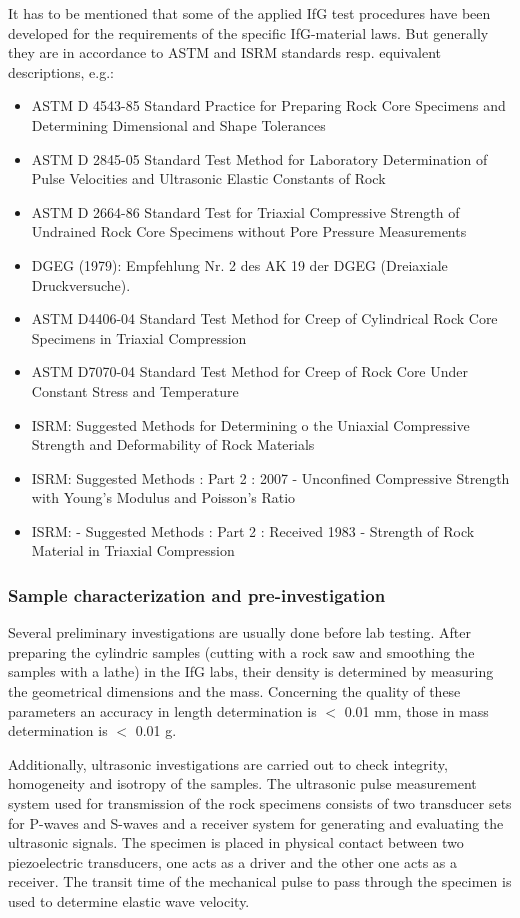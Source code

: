 It has to be mentioned that some of the applied IfG test procedures have been developed for the requirements of the specific IfG-material laws. 
But generally they are in accordance to ASTM and ISRM standards resp. equivalent descriptions, e.g.:

\begin{itemize}
\item ASTM D 4543-85 Standard Practice for Preparing Rock Core Specimens and Determining Dimensional and Shape Tolerances
\item ASTM D 2845-05 Standard Test Method for Laboratory Determination of Pulse Velocities and Ultrasonic Elastic Constants of Rock
\item ASTM D 2664-86 Standard Test for Triaxial Compressive Strength of Undrained Rock Core Specimens without Pore Pressure Measurements 
\item DGEG (1979):   Empfehlung Nr. 2 des AK 19 der DGEG (Dreiaxiale Druckversuche).
\item ASTM D4406-04 Standard Test Method for Creep of Cylindrical Rock Core Specimens in Triaxial Compression
\item ASTM D7070-04 Standard Test Method for Creep of Rock Core Under Constant Stress and Temperature
\item ISRM: Suggested Methods for Determining o the Uniaxial Compressive Strength and Deformability of Rock Materials
\item ISRM: Suggested Methods : Part 2 : 2007 - Unconfined Compressive Strength with Young's Modulus and Poisson's Ratio
\item ISRM: - Suggested Methods : Part 2 : Received 1983 - Strength of Rock Material in Triaxial Compression
\end{itemize}

\subsubsection{Sample characterization and pre-investigation}

Several preliminary investigations are usually done before lab testing. After preparing the cylindric samples (cutting with a rock saw and smoothing the samples with a lathe) in the IfG labs, their density is determined by measuring the geometrical dimensions and the mass. Concerning the quality of these parameters an accuracy in length determination is $<$ 0.01 mm, those in mass determination is $<$ 0.01 g. 

Additionally, ultrasonic investigations are carried out to check integrity, homogeneity and isotropy of the samples. The ultrasonic pulse measurement system used for transmission of the rock specimens consists of two transducer sets for P-waves and S-waves and a receiver system for generating and evaluating the ultrasonic signals. The specimen is placed in physical contact between two piezoelectric transducers, one acts as a driver and the other one acts as a receiver. The transit time of the mechanical pulse to pass through the specimen is used to determine elastic wave velocity.

